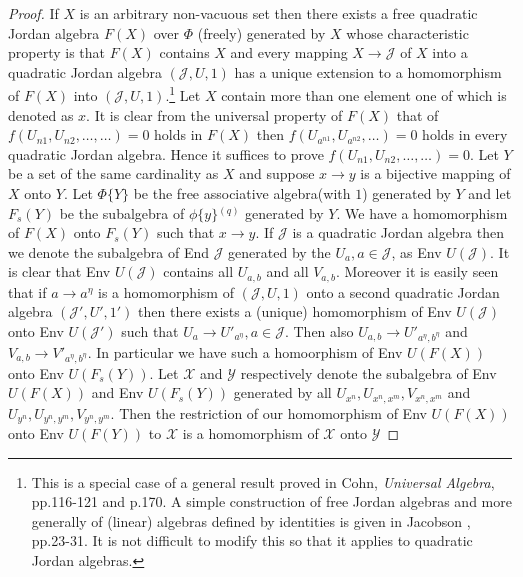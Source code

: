 \begin{proof}
  If $X$ is an arbitrary non-vacuous set then there exists a
  free\break 
  quadratic Jordan algebra $F(X)$ over $\Phi$ (freely) generated by
  $X$ whose characteristic property is that $F(X)$ contains $X$ and
  every mapping $X\to \mathscr{J}$ of $X$ into a quadratic Jordan
  algebra $(\mathscr{J},U,1)$ has a unique extension to a homomorphism
  of $F(X)$ into $(\mathscr{J},U,1)$.\footnote{This is a special case
    of a general result proved in Cohn, {\em Universal Algebra},
    pp.116-121 and p.170. A simple construction of free Jordan
    algebras and more generally of (linear) algebras defined by
    identities is given in Jacobson \cite{Jacobson1}, pp.23-31. It is
    not difficult 
    to modify this so that it applies to quadratic Jordan algebras.}
  Let $X$ contain more than one element one of which is denoted as
  $x$. It is clear from the universal property of $F(X)$ that of
  $f(U_{n1},U_{n2},\ldots,\ldots)=0$ holds in $F(X)$ then
  $f(U_{a^{n1}},U_{a^{n2}},\ldots)=0$ holds in every quadratic Jordan
  algebra. Hence it suffices to prove
  $f(U_{n1},U_{n2},\ldots,\ldots)=0$. Let $Y$ be a set of the same
  cardinality as $X$ and suppose $x \to y$ is a bijective mapping
  of $X$ onto $Y$. Let $\Phi\{Y\}$ be the free associative
  algebra\pageoriginale (with $1$) generated by $Y$ and let $F_s(Y)$
  be the subalgebra of $\phi\{y\}{^{(q)}}$ generated by $Y$. We have a
  homomorphism of $F(X)$ onto $F_s(Y)$ such that $x\to y$. If
  $\mathscr{J}$ is a quadratic Jordan algebra then we denote the
  subalgebra of End $\mathscr{J}$ generated by the $U_a,a\in
  \mathscr{J}$, as Env $U(\mathscr{J})$. It is clear that Env
  $U(\mathscr{J})$ contains all $U_{a,b}$ and all $V_{a,b}$. Moreover
  it is easily seen that if $a\to a^{\eta}$ is a homomorphism of
  $(\mathscr{J},U,1)$ onto a second quadratic Jordan algebra
  $(\mathscr{J}',U',1')$ then there exists a (unique) homomorphism of
  Env $U(\mathscr{J})$ onto Env $U(\mathscr{J}')$ such that $U_a\to
  U'_{a^{\eta}},a\in \mathscr{J}$. Then also $U_{a,b}\to
  U'_{a^{\eta},b^{\eta}}$ and $V_{a,b}\to V'_{a^{\eta},b^{\eta}}$. In
  particular we have such a homoorphism of Env $U(F(X))$ onto Env
  $U(F_s(Y))$. Let $\mathscr{X}$ and $\mathscr{Y}$ respectively denote
  the subalgebra of Env $U(F(X))$ and Env $U(F_s(Y))$ generated by all
  $U_{x^{n}},U_{x^{n},x^{m}},V_{x^{n},x^{m}}$ and
  $U_{y^{n}},U_{y^{n},y^{m}},V_{y^{n},y^{m}}$. Then the restriction of
  our homomorphism of Env $U(F(X))$ onto Env $U(F(Y))$ to
  $\mathscr{X}$ is a homomorphism of $\mathscr{X}$ onto $\mathscr{Y}$

\end{proof}
